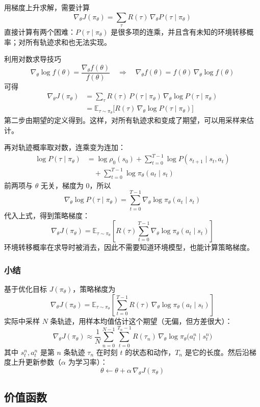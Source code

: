 \documentclass[UTF8,fontset=fandol]{ctexart}
\begin{document}
用梯度上升求解，需要计算
\[
\nabla_\theta J(\pi_\theta)=\sum_{\tau}R(\tau)\,\nabla_\theta P(\tau\mid\pi_\theta)
\]
直接计算有两个困难：$P(\tau\mid\pi_\theta)$ 是很多项的连乘，并且含有未知的环境转移概率；对所有轨迹求和也无法实现。

利用对数求导技巧
\[
\nabla_\theta\log f(\theta)=\frac{\nabla_\theta f(\theta)}{f(\theta)}
\quad\Longrightarrow\quad
\nabla_\theta f(\theta)=f(\theta)\,\nabla_\theta\log f(\theta)
\]
可得
\begin{align*}
\nabla_\theta J(\pi_\theta)
&=\sum_{\tau}R(\tau)\,P(\tau\mid\pi_\theta)\,\nabla_\theta\log P(\tau\mid\pi_\theta)\\
&=\mathbb{E}_{\tau\sim\pi_\theta}\big[R(\tau)\,\nabla_\theta\log P(\tau\mid\pi_\theta)\big]
\end{align*}
第二步由期望的定义得到。这样，对所有轨迹求和变成了期望，可以用采样来估计。

再对轨迹概率取对数，连乘变为连加：
\begin{align*}
\log P(\tau\mid\pi_\theta)
&=\log\rho_0(s_0)+\sum_{t=0}^{T-1}\log P(s_{t+1}\mid s_t,a_t)\\
&\quad+\sum_{t=0}^{T-1}\log\pi_\theta(a_t\mid s_t)
\end{align*}
前两项与 $\theta$ 无关，梯度为 $0$，所以
\[
\nabla_\theta\log P(\tau\mid\pi_\theta)=\sum_{t=0}^{T-1}\nabla_\theta\log\pi_\theta(a_t\mid s_t)
\]
代入上式，得到策略梯度：
\[
\nabla_\theta J(\pi_\theta)=\mathbb{E}_{\tau\sim\pi_\theta}\left[R(\tau)\sum_{t=0}^{T-1}\nabla_\theta\log\pi_\theta(a_t\mid s_t)\right]
\]
环境转移概率在求导时被消去，因此不需要知道环境模型，也能计算策略梯度。

\subsubsection{小结}

基于优化目标 $J(\pi_\theta)$，策略梯度为
\[
\nabla_\theta J(\pi_\theta)=\mathbb{E}_{\tau\sim\pi_\theta}\left[\sum_{t=0}^{T-1}R(\tau)\,\nabla_\theta\log\pi_\theta(a_t\mid s_t)\right]
\]
实际中采样 $N$ 条轨迹，用样本均值估计这个期望（无偏，但方差很大）：
\[
\nabla_\theta J(\pi_\theta)\approx\frac{1}{N}\sum_{n=0}^{N-1}\sum_{t=0}^{T_n-1}R(\tau_n)\,\nabla_\theta\log\pi_\theta\big(a_t^{n}\mid s_t^{n}\big)
\]
其中 $s_t^{n},a_t^{n}$ 是第 $n$ 条轨迹 $\tau_n$ 在时刻 $t$ 的状态和动作，$T_n$ 是它的长度。然后沿梯度上升更新参数（$\alpha$ 为学习率）：
\[
\theta\leftarrow\theta+\alpha\,\nabla_\theta J(\pi_\theta)
\]

\subsection{价值函数}
\end{document}
